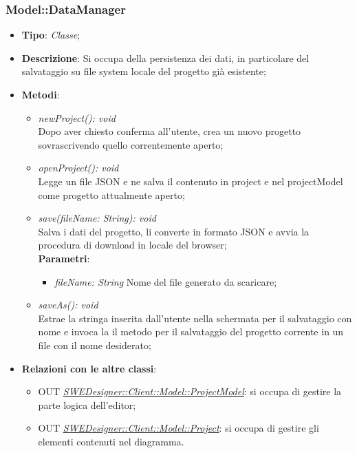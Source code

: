 \documentclass[../DefinizioneDiProdotto.tex]{subfiles}
\begin{document}
				\subsubsection{Model::DataManager}
				\hypertarget{SWEDesigner::Client::Model::DataManager}{}
					\begin{itemize}
						\item \textbf{Tipo}: \emph{Classe};
						\item \textbf{Descrizione}: Si occupa della persistenza dei dati, in particolare del salvataggio su file system locale del progetto già esistente;\\
						\item \textbf{Metodi}:
						\begin{itemize}
							\item \emph{newProject(): void} \\
							Dopo aver chiesto conferma all'utente, crea un nuovo progetto sovrascrivendo quello correntemente aperto; \\
							\item \emph{openProject(): void} \\
							Legge un file JSON e ne salva il contenuto in project e nel projectModel come progetto attualmente aperto; \\
							\item \emph{save(fileName: String): void} \\
							Salva i dati del progetto, li converte in formato JSON e avvia la procedura di download in locale del browser; \\
							\textbf{Parametri}:
							\begin{itemize}
								\item \emph{fileName: String}
								Nome del file generato da scaricare; \\
							\end{itemize}
							\item \emph{saveAs(): void}\\
							Estrae la stringa inserita dall'utente nella schermata per il salvataggio con nome e invoca la il metodo per il salvataggio del progetto corrente in un file con il nome desiderato; \\
						\end{itemize}
						\item \textbf{Relazioni con le altre classi}:
						\begin{itemize}
							\item OUT \hyperlink{SWEDesigner::Client::Model::ProjectModel}{\emph{SWEDesigner::Client::Model::ProjectModel}}: si occupa di gestire la parte logica dell'editor;
							\item OUT \hyperlink{SWEDesigner::Client::Model::Project}{\emph{SWEDesigner::Client::Model::Project}}: si occupa di gestire gli elementi contenuti nel diagramma.
						\end{itemize}
					\end{itemize}
\end{document}
